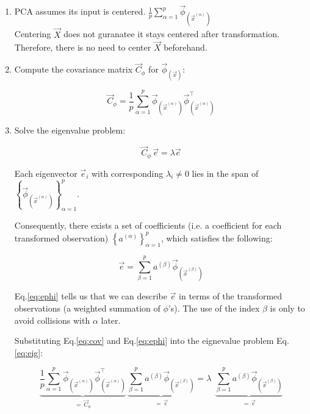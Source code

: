 \begin{enumerate}
\item PCA assumes its input is centered. 
$\frac{1}{p} \sum^{p}_{\alpha=1} \vec{\phi}_{(\vec{x}^{(\alpha)})}$\\
Centering $\vec X$ does not guranatee it stays centered after transformation.
Therefore, there is no need to center $\vec X$ beforehand.

\item Compute the covariance matrix $\vec C_{\phi}$ for $\vec{\phi}_{(\vec{x})}$:


\begin{equation} \label{eq:cov}
\vec C_{\phi} = \frac{1}{p} \sum_{\alpha=1}^{p} \vec{\phi}_{(\vec{x}^{(\alpha)})} \vec{\phi}^{\top}_{(\vec{x}^{(\alpha)})}
\end{equation}

\item Solve the eigenvalue problem:

\begin{equation} \label{eq:eig}
\vec C_{\phi} \, \vec e = \lambda \vec e
\end{equation}

Each eigenvector $\vec e_i$ with corresponding $\lambda_i \ne 0$ lies in the span of 
$
\left\{
\vec{\phi}_{(\vec{x}^{(\alpha)})}
\right\}_{\alpha=1}^{p}.
$

Consequently, there exists a set of coefficients (i.e. a coefficient for each transformed observation)
$
\left\{
a^{(\alpha)}
\right\}_{\alpha=1}^{p}
$, which satisfies the following:

\begin{equation}
\label{eq:ephi}
\vec e = \sum^{p}_{\beta=1} a^{(\beta)} \vec{\phi}_{(\vec{x}^{(\beta)})}
\end{equation}

Eq.\ref{eq:ephi} tells us that we can describe $\vec e$ in terms of the transformed observations (a weighted summation of $\phi$'s).
 The use of the index $\beta$ is only to avoid collisions with $\alpha$ later.

Substituting Eq.\ref{eq:cov} and Eq.\ref{eq:ephi} into the eignevalue problem Eq.\ref{eq:eig}:

\begin{equation*}
\underbrace{\frac{1}{p} \sum_{\alpha=1}^{p} \vec{\phi}_{(\vec{x}^{(\alpha)})} \vec{\phi}^{\top}_{(\vec{x}^{(\alpha)})} 
}_{=\,\vec C_{\phi}}
 \, 
\underbrace{\sum^{p}_{\beta=1} a^{(\beta)} \vec{\phi}_{(\vec{x}^{(\beta)})}}_{=\,\vec e}
 = \lambda \;\,
\underbrace{\sum^{p}_{\beta=1} a^{(\beta)} \vec{\phi}_{(\vec{x}^{(\beta)})}}_{=\,\vec e}
\end{equation*}


\end{enumerate}
